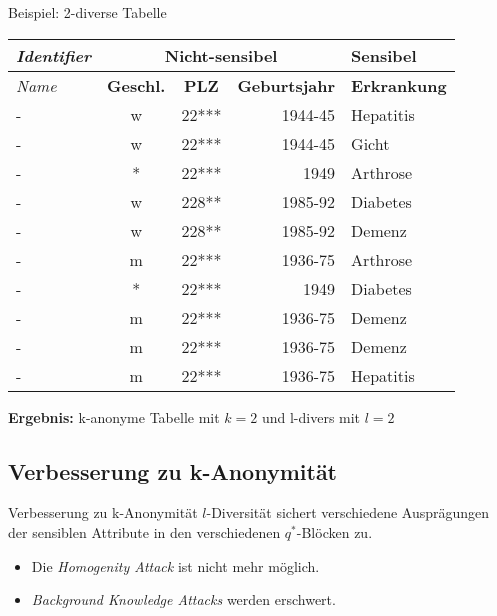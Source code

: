 \begin{frame}{Beispiel: 2-diverse Tabelle}
	\begin{center}
			\begin{tabular}{|l|c|c|r|l|}
		\hline \textit{Identifier} & \multicolumn{3}{c|}{\textbf{Nicht-sensibel}} & \textbf{Sensibel} \\ 
		\hline \textit{Name} & \textbf{Geschl.} & \textbf{PLZ} & \textbf{Geburtsjahr} & \textbf{Erkrankung} \\ \hline
		\hline \rowcolor{svshellblau1!30} 	- & w & 22*** & 1944-45 & Hepatitis \\ 
		\hline \rowcolor{svshellblau1!30}	- & w & 22*** & 1944-45 & Gicht \\ 
		\hline \rowcolor{svsgrau1!30} 		- & * & 22*** & 1949 & Arthrose \\ 
		\hline \rowcolor{svshellblau2!30} 	- & w & 228** & 1985-92 & Diabetes \\
		\hline \rowcolor{svshellblau2!30} 	- & w & 228** & 1985-92 & Demenz \\  
		\hline \rowcolor{svsrot!30} 		- & m & 22*** & 1936-75 & Arthrose \\ 
		\hline \rowcolor{svsgrau1!30} 		- & * & 22*** & 1949 & Diabetes \\ 
		\hline \rowcolor{svsrot!30} 		- & m & 22*** & 1936-75 & Demenz \\ 
		\hline \rowcolor{svsrot!30} 		- & m & 22*** & 1936-75 & Demenz \\ 
		\hline \rowcolor{svsrot!30} 		- & m & 22*** & 1936-75 & Hepatitis \\ 
		\hline 
		\end{tabular}
		\vspace{0.5cm}
        
		\textbf{Ergebnis:} k-anonyme Tabelle mit \(k=2\) und l-divers mit \(l=2\)
	\end{center}
\end{frame}


\subsection{Verbesserung zu k-Anonymität}

\begin{frame}{Verbesserung zu k-Anonymität}
	$l$-Diversität sichert verschiedene Ausprägungen der sensiblen Attribute in den verschiedenen \(q^*\)-Blöcken zu.
	
	\begin{itemize}
	\item Die \textit{Homogenity Attack} ist nicht mehr möglich.
	\item \textit{Background Knowledge Attacks} werden erschwert.
	\end{itemize}
	
\end{frame}


